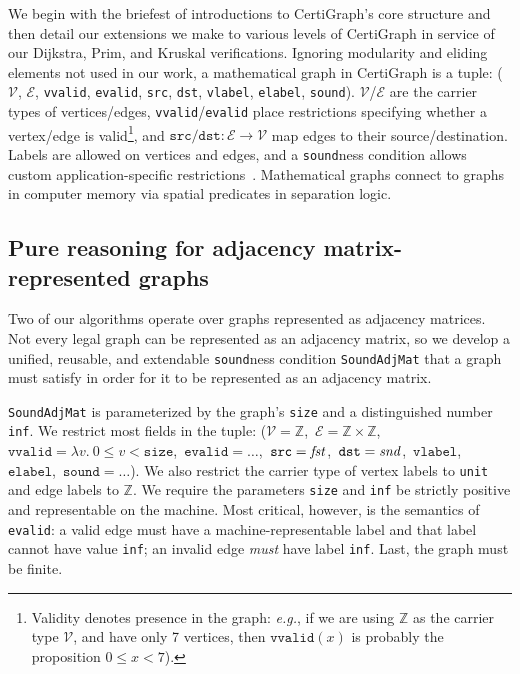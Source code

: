 We begin with the briefest of introductions to CertiGraph's core structure and then detail our extensions we make to various levels of
CertiGraph in service of our Dijkstra, Prim, and Kruskal verifications.
Ignoring modularity and eliding elements not used in our work, 
a mathematical graph in CertiGraph is a tuple:
($\mathcal{V}$, $\mathcal{E}$, \texttt{vvalid}, \texttt{evalid},
\texttt{src}, \texttt{dst}, \texttt{vlabel}, \texttt{elabel}, 
\texttt{sound}). $\mathcal{V}$/$\mathcal{E}$ are the carrier
types of vertices/edges, \texttt{vvalid}/\texttt{evalid}
place restrictions specifying whether a vertex/edge is 
valid\footnote{Validity denotes presence in the graph: \emph{e.g.}, if we are using $\mathbb{Z}$ as the carrier type $\mathcal{V}$, and have
only 7 vertices, then $\texttt{vvalid}(x)$ is probably the proposition $0 \le x < 7$).},
and $\texttt{src}/\texttt{dst} : \mathcal{E} \to \mathcal{V}$ map edges to their source/destination.
Labels are allowed on vertices and edges, and
a \texttt{sound}ness condition allows custom application-specific
restrictions~\cite{DBLP:journals/pacmpl/WangCMH19}.
Mathematical graphs connect to graphs in computer memory via spatial predicates in separation logic.

\subsection{Pure reasoning for adjacency matrix-represented graphs}
\label{sec:adjmatpure}

Two of our algorithms operate over graphs represented as adjacency matrices.
Not every legal graph can be represented as an adjacency matrix,
so we develop a unified, reusable, and extendable \texttt{sound}ness condition
\texttt{SoundAdjMat} that a graph must satisfy in order for it
to be represented as an adjacency matrix.

\texttt{SoundAdjMat} is parameterized by the graph's \texttt{size} and a distinguished number \texttt{inf}.
We restrict most fields in the tuple:
($\mathcal{V}=\mathbb{Z}$,\ $\mathcal{E}=\mathbb{Z} \times \mathbb{Z}$,\ $\texttt{vvalid}=\lambda v.~\mbox{$0 \le v < \texttt{size}$}$,\ $\texttt{evalid}=\ldots$,\ $\texttt{src}=\mathit{fst}$,\ $\texttt{dst}=\mathit{snd}$,\ $\texttt{vlabel}$,\ $\texttt{elabel}$,\ $\texttt{sound}=\ldots$).  We also restrict the carrier type of vertex labels to \texttt{unit} and edge labels to $\mathbb{Z}$.
We require the parameters \texttt{size} and \texttt{inf} be
strictly positive and representable on the machine.
Most critical, however, is the semantics of \texttt{evalid}:
a valid edge must have a machine-representable label and that label
cannot have value \texttt{inf}; an invalid edge \emph{must} have label \texttt{inf}.
Last, the graph must be finite.


